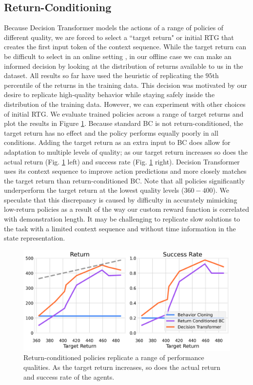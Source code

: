 \subsection{Return-Conditioning}
Because Decision Transformer models the actions of a range of policies of different quality, we are forced to select a ``target return" or initial RTG that creates the first input token of the context sequence. While the target return can be difficult to select in an online setting \cite{online_decisiontransformer, udrl_implementation}, in our offline case we can make an informed decision by looking at the distribution of returns available to us in the dataset. All results so far have used the heuristic of replicating the $95$th percentile of the returns in the training data. This decision was motivated by our desire to replicate high-quality behavior while staying safely inside the distribution of the training data. However, we can experiment with other choices of initial RTG. We evaluate trained policies across a range of target returns and plot the results in Figure \ref{fig:success_rate_curve}. Because standard BC is not return-conditioned, the target return has no effect and the policy performs equally poorly in all conditions. Adding the target return as an extra input to BC does allow for adaptation to multiple levels of quality; as our target return increases so does the actual return (Fig. \ref{fig:success_rate_curve} left) and success rate (Fig. \ref{fig:success_rate_curve} right). Decision Transformer uses its context sequence to improve action predictions and more closely matches the target return than return-conditioned BC. Note that all policies significantly underperform the target return at the lowest quality levels ($360-400$). We speculate that this discrepancy is caused by difficulty in accurately mimicking low-return policies as a result of the way our custom reward function is correlated with demonstration length. It may be challenging to replicate slow solutions to the task with a limited context sequence and without time information in the state representation. 

\label{sec:expreturnsweep}
\begin{figure}
    \centering
    \includegraphics[width=\columnwidth]{figs/success_rate_curve.png}
    \caption{Return-conditioned policies replicate a range of performance qualities. As the target return increases, so does the actual return and success rate of the agents.} 
    \label{fig:success_rate_curve}
\end{figure}